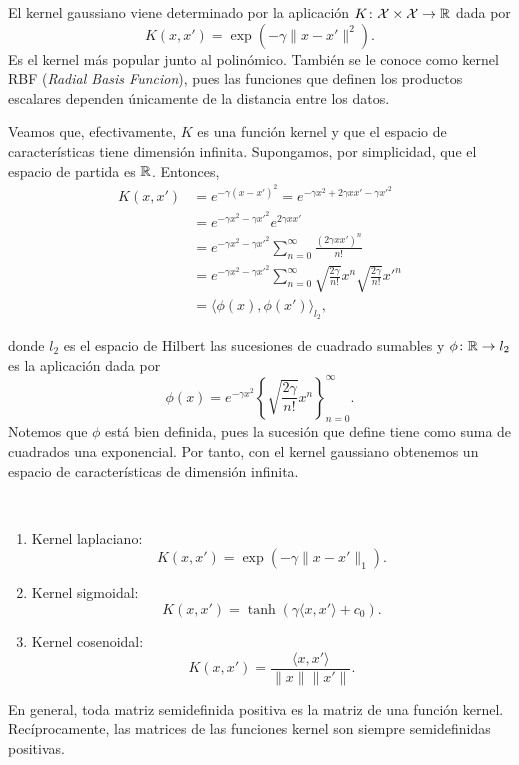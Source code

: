 \begin{ex}
    El kernel gaussiano viene determinado por la aplicación $K\colon \mathcal{X} \times \mathcal{X} \to \mathbb{R}$ dada por
    \[ K(x,x') = \exp(-\gamma\|x-x'\|^2).\]
    Es el kernel más popular junto al polinómico. También se le conoce como kernel RBF (\emph{Radial Basis Funcion}), pues las funciones que definen los productos escalares dependen únicamente de la distancia entre los datos.

    Veamos que, efectivamente, $K$ es una función kernel y que el espacio de características tiene dimensión infinita. Supongamos, por simplicidad, que el espacio de partida es $\mathbb{R}$. Entonces,
    \begin{align*}
        K(x,x') &= e^{-\gamma(x-x')^2} = e^{-\gamma x^2 + 2\gamma xx' -\gamma x'^2 } \\
                &= e^{-\gamma x^2 -\gamma x'^2 }e^{2\gamma xx'} \\
                &= e^{-\gamma x^2 -\gamma x'^2 }\sum_{n=0}^{\infty} \frac{(2\gamma xx')^n}{n!} \\
                &= e^{-\gamma x^2 -\gamma x'^2 }\sum_{n=0}^{\infty} \sqrt{\frac{2\gamma}{n!}}x^n\sqrt{\frac{2\gamma}{n!}}x'^n \\
                &= \langle \phi(x), \phi(x') \rangle_{l_2}, 
    \end{align*}

    donde $l_2$ es el espacio de Hilbert las sucesiones de cuadrado sumables y $\phi \colon \mathbb{R} \to l_2$ es la aplicación dada por
    \[\phi(x) = e^{-\gamma x^2}\left\{ \sqrt{\frac{2\gamma}{n!}}x^n \right\}_{n=0}^{\infty}.\]
    Notemos que $\phi$ está bien definida, pues la sucesión que define tiene como suma de cuadrados una exponencial. Por tanto, con el kernel gaussiano obtenemos un espacio de características de dimensión infinita.
\end{ex}

\begin{ex}
    $ $ \newline
    \begin{enumerate}
        \item Kernel laplaciano: \[ K(x,x') = \exp(-\gamma\|x-x'\|_1). \]
        \item Kernel sigmoidal: \[ K(x,x') = \tanh(\gamma \langle x,x' \rangle + c_0). \]
        \item Kernel cosenoidal: \[ K(x,x') = \frac{\langle x,x' \rangle}{ \|x\|\|x'\|}. \]
    \end{enumerate}
    En general, toda matriz semidefinida positiva es la matriz de una función kernel. Recíprocamente, las matrices de las funciones kernel son siempre semidefinidas positivas.
\end{ex}

